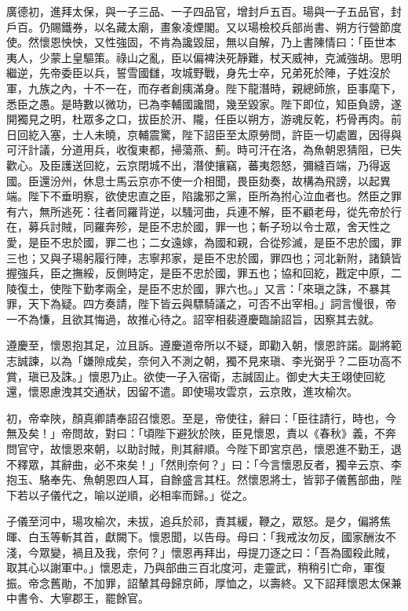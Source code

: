 \begin{pinyinscope}
 廣德初，進拜太保，與一子三品、一子四品官，增封戶五百。瑒與一子五品官，封戶百。仍賜鐵券，以名藏太廟，畫象凌煙閣。又以瑒檢校兵部尚書、朔方行營節度使。然懷恩怏怏，又性強固，不肯為讒毀屈，無以自解，乃上書陳情曰：「臣世本夷人，少蒙上皇驅策。祿山之亂，臣以偏裨決死靜難，杖天威神，克滅強胡。思明繼逆，先帝委臣以兵，誓雪國讎，攻城野戰，身先士卒，兄弟死於陣，子姓沒於軍，九族之內，十不一在，而存者創痍滿身。陛下龍潛時，親總師旅，臣事麾下，悉臣之愚。是時數以微功，已為李輔國讒間，幾至毀家。陛下即位，知臣負謗，遂開獨見之明，杜眾多之口，拔臣於汧、隴，任臣以朔方，游魂反乾，朽骨再肉。前日回紇入塞，士人未曉，京輔震驚，陛下詔臣至太原勞問，許臣一切處置，因得與可汗計議，分道用兵，收復東都，掃蕩燕、薊。時可汗在洛，為魚朝恩猜阻，已失歡心。及臣護送回紇，云京閉城不出，潛使攘竊，蕃夷怨怒，彌縫百端，乃得返國。臣還汾州，休息士馬云京亦不使一介相聞，畏臣劾奏，故構為飛謗，以起異端。陛下不垂明察，欲使忠直之臣，陷讒邪之黨，臣所為拊心泣血者也。然臣之罪有六，無所逃死：往者同羅背逆，以騷河曲，兵連不解，臣不顧老母，從先帝於行在，募兵討賊，同羅奔殄，是臣不忠於國，罪一也；斬子玢以令士眾，舍天性之愛，是臣不忠於國，罪二也；二女遠嫁，為國和親，合從殄滅，是臣不忠於國，罪三也；又與子瑒躬履行陣，志寧邦家，是臣不忠於國，罪四也；河北新附，諸鎮皆握強兵，臣之撫綏，反側時定，是臣不忠於國，罪五也；協和回紇，戡定中原，二陵復土，使陛下勤孝兩全，是臣不忠於國，罪六也。」又言：「來瑱之誅，不暴其罪，天下為疑。四方奏請，陛下皆云與驃騎議之，可否不出宰相。」詞言慢很，帝一不為慊，且欲其悔過，故推心待之。詔宰相裴遵慶臨諭詔旨，因察其去就。



 遵慶至，懷恩抱其足，泣且訴。遵慶道帝所以不疑，即勸入朝，懷恩許諾。副將範志誠諫，以為「嫌隙成矣，奈何入不測之朝，獨不見來瑱、李光弼乎？二臣功高不賞，瑱已及誅。」懷恩乃止。欲使一子入宿衛，志誠固止。御史大夫王翊使回紇還，懷恩慮洩其交通狀，因留不遣。即使瑒攻雲京，云京敗，進攻榆次。



 初，帝幸陜，顏真卿請奉詔召懷恩。至是，帝使往，辭曰：「臣往請行，時也，今無及矣！」帝問故，對曰：「頃陛下避狄於陜，臣見懷恩，責以《春秋》義，不奔問官守，故懷恩來朝，以助討賊，則其辭順。今陛下即宮京邑，懷恩進不勤王，退不釋眾，其辭曲，必不來矣！」「然則奈何？」曰：「今言懷恩反者，獨辛云京、李抱玉、駱奉先、魚朝恩四人耳，自餘盛言其枉。然懷恩將士，皆郭子儀舊部曲，陛下若以子儀代之，喻以逆順，必相率而歸。」從之。



 子儀至河中，瑒攻榆次，未拔，追兵於祁，責其緩，鞭之，眾怒。是夕，偏將焦暉、白玉等斬其首，獻闕下。懷恩聞，以告母。母曰：「我戒汝勿反，國家酬汝不淺，今眾變，禍且及我，奈何？」懷恩再拜出，母提刀逐之曰：「吾為國殺此賊，取其心以謝軍中。」懷恩走，乃與部曲三百北度河，走靈武，稍稍引亡命，軍復振。帝念舊勛，不加罪，詔輦其母歸京師，厚恤之，以壽終。又下詔拜懷恩太保兼中書令、大寧郡王，罷餘官。




\end{pinyinscope}
